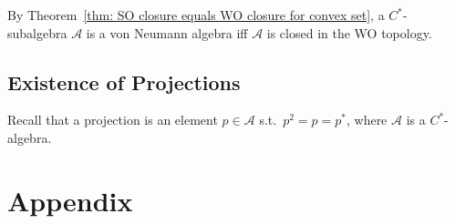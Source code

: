 \documentclass[openany, a5paper]{book}
\begin{document}
By Theorem~\ref{thm: SO closure equals WO closure for convex set}, a $C^*$-subalgebra $\mathscr A$ is a von Neumann algebra iff $\mathscr A$ is closed in the WO topology.

\section{Existence of Projections}

Recall that a projection is an element $p \in \mathscr A$ s.t.\ $p^2 = p = p^*$, where $\mathscr A$ is a $C^*$-algebra.



\appendix
\renewcommand{\theequation}{\Alph{chapter}-\arabic{equation}}
\chapter{Appendix}

\backmatter
\nocite{*} %
\printbibliography[heading=bibliography, title={Bibliography}]

\printindex[symbol]

\printindex
\end{document}
